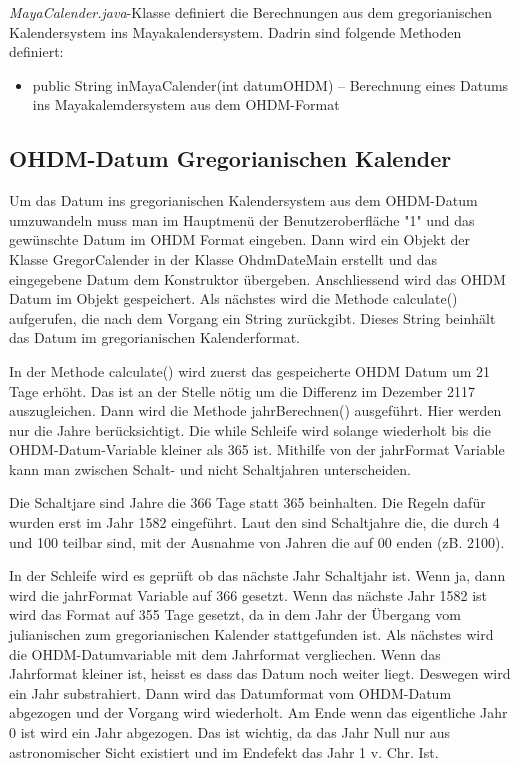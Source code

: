 \documentclass[]{article}
\begin{document}
\textit{MayaCalender.java}-Klasse definiert die Berechnungen aus dem gregorianischen Kalendersystem ins Mayakalendersystem. Dadrin sind folgende Methoden definiert:
\begin{itemize}
	\item public String inMayaCalender(int datumOHDM) –  Berechnung eines Datums ins Mayakalemdersystem aus dem OHDM-Format
	\newline
\end{itemize}


\subsection{OHDM-Datum \textrightarrow Gregorianischen Kalender}
Um das Datum ins gregorianischen Kalendersystem aus dem OHDM-Datum umzuwandeln muss man im Hauptmenü der Benutzeroberfläche "1" und das gewünschte Datum im OHDM Format eingeben. Dann wird ein Objekt der Klasse GregorCalender in der Klasse OhdmDateMain erstellt und das eingegebene Datum dem Konstruktor übergeben. Anschliessend wird das OHDM Datum im Objekt gespeichert. Als nächstes wird die Methode calculate() aufgerufen, die nach dem Vorgang ein String zurückgibt. Dieses String beinhält das Datum im gregorianischen Kalenderformat.

In der Methode calculate() wird zuerst das gespeicherte OHDM Datum um 21 Tage erhöht. Das ist an der Stelle nötig um die Differenz im Dezember 2117 auszugleichen. Dann wird die Methode jahrBerechnen() ausgeführt. Hier werden nur die Jahre berücksichtigt. Die while Schleife wird solange wiederholt bis die OHDM-Datum-Variable kleiner als 365 ist. Mithilfe von der jahrFormat Variable kann man zwischen Schalt- und nicht Schaltjahren unterscheiden. 

Die Schaltjare sind Jahre die 366 Tage statt 365 beinhalten. Die Regeln dafür wurden erst im Jahr 1582 eingeführt. Laut den sind Schaltjahre die, die durch 4 und 100 teilbar sind, mit der Ausnahme von Jahren die auf 00 enden (zB. 2100).

In der Schleife wird es geprüft ob das nächste Jahr Schaltjahr ist. Wenn ja, dann wird die jahrFormat Variable auf 366 gesetzt. Wenn das nächste Jahr 1582 ist wird das Format auf 355 Tage gesetzt, da in dem Jahr der Übergang vom julianischen zum gregorianischen  Kalender stattgefunden ist. Als nächstes wird die OHDM-Datumvariable mit dem Jahrformat vergliechen. Wenn das Jahrformat kleiner ist, heisst es dass das Datum noch weiter liegt. Deswegen wird ein Jahr substrahiert. Dann wird das Datumformat vom OHDM-Datum abgezogen und der Vorgang wird wiederholt. Am Ende wenn das eigentliche Jahr 0 ist wird ein Jahr abgezogen. Das ist wichtig, da das Jahr Null nur aus astronomischer Sicht existiert und im Endefekt das Jahr 1 v. Chr. Ist.
\end{document}
